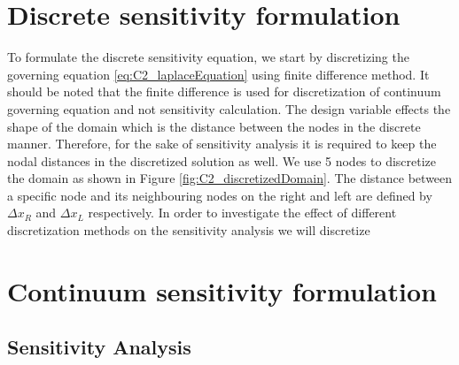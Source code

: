 \section{Discrete sensitivity formulation}
To formulate the discrete sensitivity equation, we start by discretizing the governing equation \eqref{eq:C2_laplaceEquation} using finite difference method. It should be noted that the finite difference is used for discretization of continuum governing equation and not sensitivity calculation. The design variable effects the shape of the domain which is the distance between the nodes in the discrete manner. Therefore, for the sake of sensitivity analysis it is required to keep the nodal distances in the discretized solution as well. We use 5 nodes to discretize the domain as shown in Figure \ref{fig:C2_discretizedDomain}. The distance between a specific node and its neighbouring nodes on the right and left are defined by $\Delta x_R$ and $\Delta x_L$ respectively. In order to investigate the effect of different discretization methods on the sensitivity analysis we will discretize 

\section{Continuum sensitivity formulation}

\subsection{Sensitivity Analysis}
